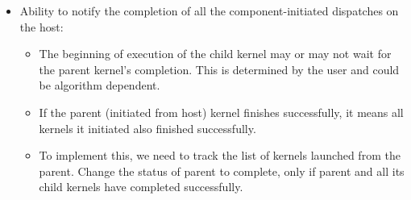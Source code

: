 \documentclass{book}
\begin{document}
\begin{appendices}
\begin{itemize}
\item Ability to notify the completion of all the
component-\/initiated dispatches on the host\-:

\begin{itemize}
\item The beginning of execution of the child kernel may or may not
wait for the parent kernel's completion. This is determined by the
user and could be algorithm dependent.
\item If the parent (initiated from host) kernel finishes
successfully, it means all kernels it initiated also finished
successfully.
\item To implement this, we need to track the list of kernels
launched from the parent. Change the status of parent to complete,
only if parent and all its child kernels have completed
successfully.
\end{itemize}
\end{itemize}


\end{appendices}
\end{document}
